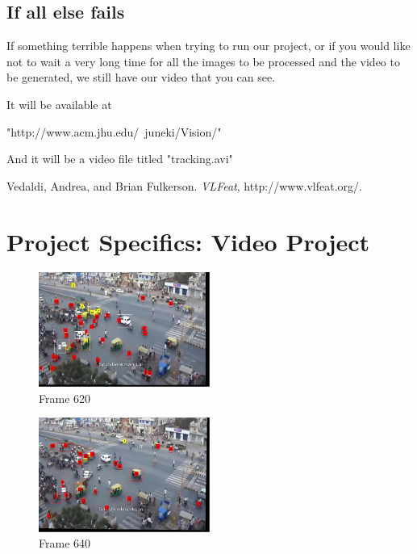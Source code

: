 \documentclass[a4paper, 10pt, conference]{ieeeconf}      %
\begin{document}
\subsection{If all else fails}
If something terrible happens when trying to run our project, or if you would like not to wait a very long time for all the images to be processed and the video to be generated, we still have our video that you can see. \newline

It will be available at 

"http://www.acm.jhu.edu/~juneki/Vision/"

And it will be a video file titled "tracking.avi"\newline




\begin{thebibliography}{99}

Vedaldi, Andrea, and Brian Fulkerson. {\it VLFeat}, http://www.vlfeat.org/.

\end{thebibliography}





\newpage

\section{Project Specifics: Video Project}


\begin{figure}[h!]
\caption{Frame 620}
\centering
\includegraphics[width=0.5\textwidth]{620.jpg}
\end{figure}

\begin{figure}[h!]
\caption{Frame 640}
\centering
\includegraphics[width=0.5\textwidth]{640.jpg}
\end{figure}
\end{document}
